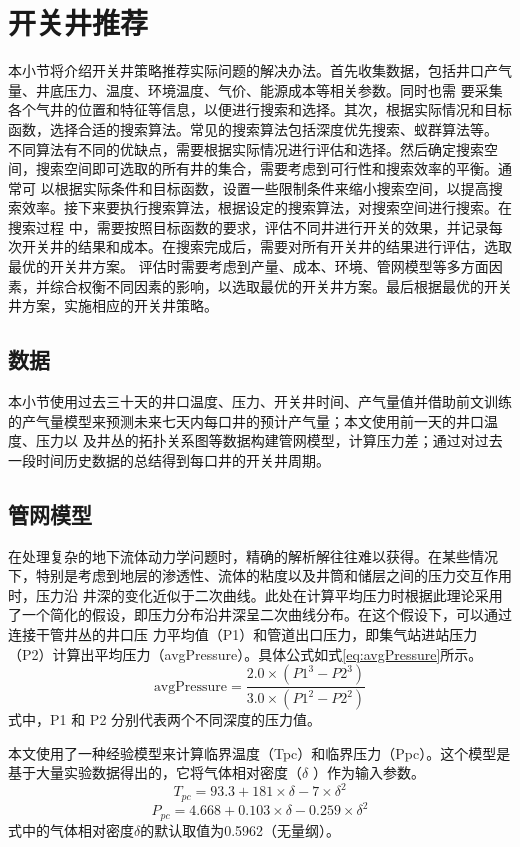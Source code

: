 \section{开关井推荐}
本小节将介绍开关井策略推荐实际问题的解决办法。首先收集数据，包括井口产气量、井底压力、温度、环境温度、气价、能源成本等相关参数。同时也需
要采集各个气井的位置和特征等信息，以便进行搜索和选择。其次，根据实际情况和目标函数，选择合适的搜索算法。常见的搜索算法包括深度优先搜索、蚁群算法等。
不同算法有不同的优缺点，需要根据实际情况进行评估和选择。然后确定搜索空间，搜索空间即可选取的所有井的集合，需要考虑到可行性和搜索效率的平衡。通常可
以根据实际条件和目标函数，设置一些限制条件来缩小搜索空间，以提高搜索效率。接下来要执行搜索算法，根据设定的搜索算法，对搜索空间进行搜索。在搜索过程
中，需要按照目标函数的要求，评估不同井进行开关的效果，并记录每次开关井的结果和成本。在搜索完成后，需要对所有开关井的结果进行评估，选取最优的开关井方案。
评估时需要考虑到产量、成本、环境、管网模型等多方面因素，并综合权衡不同因素的影响，以选取最优的开关井方案。最后根据最优的开关井方案，实施相应的开关井策略。
\subsection{数据}
本小节使用过去三十天的井口温度、压力、开关井时间、产气量值并借助前文训练的产气量模型来预测未来七天内每口井的预计产气量；本文使用前一天的井口温度、压力以
及井丛的拓扑关系图等数据构建管网模型，计算压力差；通过对过去一段时间历史数据的总结得到每口井的开关井周期。
\subsection{管网模型}
在处理复杂的地下流体动力学问题时，精确的解析解往往难以获得。在某些情况下，特别是考虑到地层的渗透性、流体的粘度以及井筒和储层之间的压力交互作用时，压力沿
井深的变化近似于二次曲线。此处在计算平均压力时根据此理论采用了一个简化的假设，即压力分布沿井深呈二次曲线分布。在这个假设下，可以通过连接干管井丛的井口压
力平均值（P1）和管道出口压力，即集气站进站压力（P2）计算出平均压力（avgPressure）。具体公式如式\eqref{eq:avgPressure}所示。
\begin{equation}
    \text{avgPressure} = \frac{2.0 \times (P1^3 - P2^3)}{3.0 \times (P1^2 - P2^2)}
    \label{eq:avgPressure}
\end{equation}
式中，P1 和 P2 分别代表两个不同深度的压力值。

本文使用了一种经验模型来计算临界温度（Tpc）和临界压力（Ppc）。这个模型是基于大量实验数据得出的，它将气体相对密度（$\delta$ ）作为输入参数。
\begin{equation}
    T_{pc} = 93.3 + 181 \times \delta - 7 \times \delta^2
\end{equation}
\begin{equation}
    P_{pc} = 4.668 + 0.103 \times \delta - 0.259 \times \delta^2
\end{equation}
式中的气体相对密度$\delta$的默认取值为0.5962（无量纲）。

